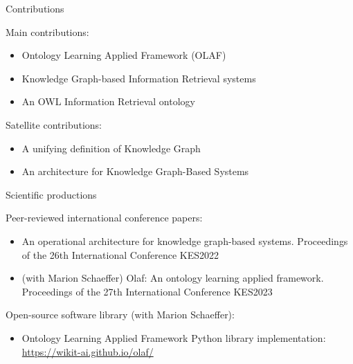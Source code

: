 \begin{frame}{Contributions}


    Main contributions:
    \begin{itemize}
        \item Ontology Learning Applied Framework (OLAF)
        \item Knowledge Graph-based Information Retrieval systems
        \item An OWL Information Retrieval ontology
    \end{itemize}

    Satellite contributions:
    \begin{itemize}
        \item A unifying definition of Knowledge Graph
        \item An architecture for Knowledge Graph-Based Systems
    \end{itemize}
    
\end{frame}

\begin{frame}{Scientific productions}

    Peer-reviewed international conference papers:
    \begin{itemize}
        \item An operational architecture for knowledge graph-based systems. Proceedings of the 26th International Conference KES2022
        \item (with Marion Schaeffer) Olaf: An ontology learning applied framework. Proceedings of the 27th International Conference KES2023
    \end{itemize}

    Open-source software library (with Marion Schaeffer):
    \begin{itemize}
        \item Ontology Learning Applied Framework Python library implementation:\\\href{https://wikit-ai.github.io/olaf/}{https://wikit-ai.github.io/olaf/}
    \end{itemize}

\end{frame}